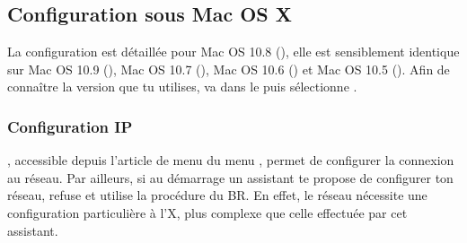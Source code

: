 



\subsection{Configuration sous Mac OS X}

La configuration est détaillée pour Mac OS 10.8 (), elle est sensiblement identique sur Mac OS 10.9 (),  Mac OS 10.7 (), Mac OS 10.6 () et Mac OS 10.5 ().
Afin de connaître la version que tu utilises, va dans le  puis sélectionne .

\subsubsection{Configuration IP}

 , accessible depuis l'article de menu  du menu , permet de configurer la connexion au réseau. Par ailleurs, si au démarrage un assistant te propose de configurer ton réseau, refuse et utilise la procédure du BR. En effet, le réseau nécessite une configuration particulière à l'X, plus complexe que celle effectuée par cet assistant.


